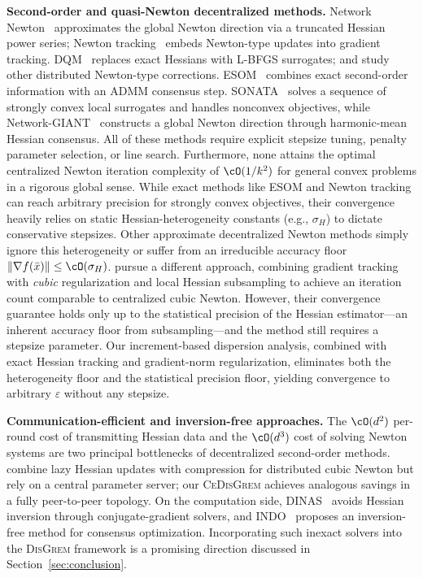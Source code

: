 \documentclass[review,onefignum,onetabnum]{siamart171218}
\begin{document}
	\noindent\textbf{Second-order and quasi-Newton decentralized methods.}
	Network Newton~\citep{mokhtari2015networknewton_arxiv} approximates
	the global Newton direction via a truncated Hessian power series;
	Newton tracking~\citep{mokhtari2020newtontracking} embeds Newton-type
	updates into gradient tracking.
	DQM~\citep{eisen2017dqn} replaces exact Hessians with L-BFGS
	surrogates; \citet{bajovic2017newton} and
	\citet{zhang2021distributed} study other distributed Newton-type
	corrections.
	ESOM~\citep{mokhtari2016esom} combines exact second-order information
	with an ADMM consensus step.
	SONATA~\citep{sun2022sonata} solves a sequence of strongly convex
	local surrogates and handles nonconvex objectives, while
	Network-GIANT~\citep{ye2023networkgiant} constructs a global Newton
	direction through harmonic-mean Hessian consensus.
	All of these methods require explicit stepsize tuning, penalty
	parameter selection, or line search.
	Furthermore, none attains the optimal centralized Newton iteration
	complexity of $\cO(1/k^2)$ for general convex problems in a
	rigorous global sense.
	While exact methods like ESOM and Newton tracking can reach
	arbitrary precision for strongly convex objectives, their
	convergence heavily relies on static Hessian-heterogeneity
	constants (e.g., $\sigma_H$) to dictate conservative stepsizes.
	Other approximate decentralized Newton methods simply ignore this
	heterogeneity or suffer from an irreducible accuracy floor
	$\|\nabla f(\bar x)\|\le\cO(\sigma_H)$.
	\citet{daneshmand2021newton} pursue a different approach, combining
	gradient tracking with \emph{cubic} regularization and local Hessian
	subsampling to achieve an iteration count comparable to centralized
	cubic Newton.
	However, their convergence guarantee holds only up to the statistical
	precision of the Hessian estimator---an inherent accuracy floor from
	subsampling---and the method still requires a stepsize parameter.
	Our increment-based dispersion analysis, combined with
	exact Hessian tracking and gradient-norm regularization, eliminates
	both the heterogeneity floor and the statistical precision floor,
	yielding convergence to arbitrary $\varepsilon$ without any stepsize.

	\noindent\textbf{Communication-efficient and inversion-free approaches.}
	The $\cO(d^2)$ per-round cost of transmitting Hessian data and
	the $\cO(d^3)$ cost of solving Newton systems are two principal
	bottlenecks of decentralized second-order methods.
	\citet{zhang2024distributed} combine lazy Hessian updates with
	compression for distributed cubic Newton but rely on a central
	parameter server; our \textsc{CeDisGrem} achieves analogous
	savings in a fully peer-to-peer topology.
	On the computation side, DINAS~\citep{crane2025dinas} avoids
	Hessian inversion through conjugate-gradient solvers, and
	INDO~\citep{yuan2023indo} proposes an inversion-free method for
	consensus optimization.
	Incorporating such inexact solvers into the \textsc{DisGrem}
	framework is a promising direction discussed in
	Section~\ref{sec:conclusion}.
\end{document}
